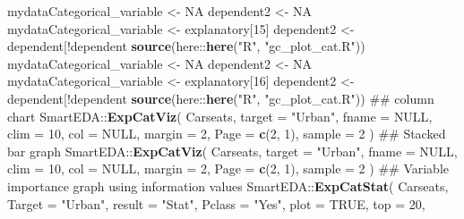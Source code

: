\documentclass[
]{article}
\newenvironment{Shaded}{\begin{snugshade}}{\end{snugshade}}
\newcommand{\CommentTok}[1]{\textcolor[rgb]{0.54,0.53,0.53}{#1}}
\newcommand{\DataTypeTok}[1]{\textcolor[rgb]{0.00,0.34,0.68}{#1}}
\newcommand{\DecValTok}[1]{\textcolor[rgb]{0.69,0.50,0.00}{#1}}
\newcommand{\KeywordTok}[1]{\textcolor[rgb]{0.12,0.11,0.11}{\textbf{#1}}}
\newcommand{\NormalTok}[1]{\textcolor[rgb]{0.12,0.11,0.11}{#1}}
\newcommand{\OperatorTok}[1]{\textcolor[rgb]{0.12,0.11,0.11}{#1}}
\newcommand{\OtherTok}[1]{\textcolor[rgb]{0.00,0.43,0.16}{#1}}
\newcommand{\StringTok}[1]{\textcolor[rgb]{0.75,0.01,0.01}{#1}}
\begin{document}
\begin{Shaded}
\begin{Highlighting}[]
{{{{{{{{{{{{{{{{{{{{{{{{{{{{{{{{{{{{{{{{{{{{{{{{{{{{{{{{{{{{{{{{{{{{{{{{{{{{{{{{{{{{{{{{{{{{{{{{{{{{{{{{{{{{{{{{{{{{{{{{{{{{{{{{{{{{{{{{{{{{{{{{{{{{{{{{{{{{{{{{{{{{{{{{{{{{{{{{{{{{{{{{{{{{{{{{{{{{{{{{{{{{{{{{{{{{{{{{{{{{{{{{{{{{{{{{{{{{{{{{{\NormalTok{mydataCategorical_variable <-}\StringTok{ }\OtherTok{NA}
\NormalTok{dependent2 <-}\StringTok{ }\OtherTok{NA}
\NormalTok{mydataCategorical_variable <-}\StringTok{ }\NormalTok{explanatory[}\DecValTok{15}\NormalTok{]}
\NormalTok{dependent2 <-}\StringTok{ }\NormalTok{dependent[}\OperatorTok{!}\NormalTok{dependent }\OperatorTok{%in%}\StringTok{ }\NormalTok{mydataCategorical_variable]}
\KeywordTok{source}\NormalTok{(here}\OperatorTok{::}\KeywordTok{here}\NormalTok{(}\StringTok{"R"}\NormalTok{, }\StringTok{"gc_plot_cat.R"}\NormalTok{))}
\NormalTok{mydataCategorical_variable <-}\StringTok{ }\OtherTok{NA}
\NormalTok{dependent2 <-}\StringTok{ }\OtherTok{NA}
\NormalTok{mydataCategorical_variable <-}\StringTok{ }\NormalTok{explanatory[}\DecValTok{16}\NormalTok{]}
\NormalTok{dependent2 <-}\StringTok{ }\NormalTok{dependent[}\OperatorTok{!}\NormalTok{dependent }\OperatorTok{%in%}\StringTok{ }\NormalTok{mydataCategorical_variable]}
\KeywordTok{source}\NormalTok{(here}\OperatorTok{::}\KeywordTok{here}\NormalTok{(}\StringTok{"R"}\NormalTok{, }\StringTok{"gc_plot_cat.R"}\NormalTok{))}
\CommentTok{## column chart}
\NormalTok{SmartEDA}\OperatorTok{::}\KeywordTok{ExpCatViz}\NormalTok{(}
\NormalTok{  Carseats,}
  \DataTypeTok{target =} \StringTok{"Urban"}\NormalTok{,}
  \DataTypeTok{fname =} \OtherTok{NULL}\NormalTok{,}
  \DataTypeTok{clim =} \DecValTok{10}\NormalTok{,}
  \DataTypeTok{col =} \OtherTok{NULL}\NormalTok{,}
  \DataTypeTok{margin =} \DecValTok{2}\NormalTok{,}
  \DataTypeTok{Page =} \KeywordTok{c}\NormalTok{(}\DecValTok{2}\NormalTok{, }\DecValTok{1}\NormalTok{),}
  \DataTypeTok{sample =} \DecValTok{2}
\NormalTok{)}
\CommentTok{## Stacked bar graph}
\NormalTok{SmartEDA}\OperatorTok{::}\KeywordTok{ExpCatViz}\NormalTok{(}
\NormalTok{  Carseats,}
  \DataTypeTok{target =} \StringTok{"Urban"}\NormalTok{,}
  \DataTypeTok{fname =} \OtherTok{NULL}\NormalTok{,}
  \DataTypeTok{clim =} \DecValTok{10}\NormalTok{,}
  \DataTypeTok{col =} \OtherTok{NULL}\NormalTok{,}
  \DataTypeTok{margin =} \DecValTok{2}\NormalTok{,}
  \DataTypeTok{Page =} \KeywordTok{c}\NormalTok{(}\DecValTok{2}\NormalTok{, }\DecValTok{1}\NormalTok{),}
  \DataTypeTok{sample =} \DecValTok{2}
\NormalTok{)}
\CommentTok{## Variable importance graph using information values}
\NormalTok{SmartEDA}\OperatorTok{::}\KeywordTok{ExpCatStat}\NormalTok{(}
\NormalTok{  Carseats,}
  \DataTypeTok{Target =} \StringTok{"Urban"}\NormalTok{,}
  \DataTypeTok{result =} \StringTok{"Stat"}\NormalTok{,}
  \DataTypeTok{Pclass =} \StringTok{"Yes"}\NormalTok{,}
  \DataTypeTok{plot =} \OtherTok{TRUE}\NormalTok{,}
  \DataTypeTok{top =} \DecValTok{20}\NormalTok{,}
}}}}}}}}}}}}}}}}}}}}}}}}}}}}}}}}}}}}}}}}}}}}}}}}}}}}}}}}}}}}}}}}}}}}}}}}}}}}}}}}}}}}}}}}}}}}}}}}}}}}}}}}}}}}}}}}}}}}}}}}}}}}}}}}}}}}}}}}}}}}}}}}}}}}}}}}}}}}}}}}}}}}}}}}}}}}}}}}}}}}}}}}}}}}}}}}}}}}}}}}}}}}}}}}}}}}}}}}}}}}}}}}}}}}}}}}}}}}}}}}}}}
\end{Highlighting}
\end{Shaded}
\end{document}
